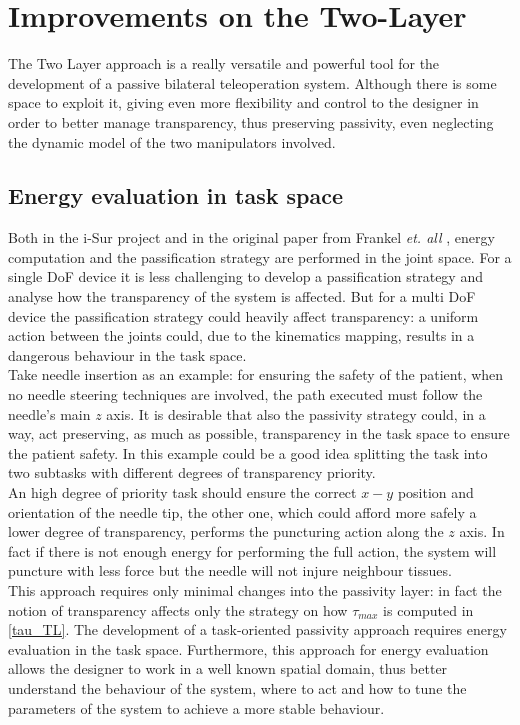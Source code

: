 \section{Improvements  on the Two-Layer  }\label{TwoLayer_improvements}
The Two Layer approach is a really versatile and powerful tool for the development of a passive bilateral teleoperation system. Although there is some space to exploit it, giving even more flexibility and control to the designer in order to better manage transparency, thus preserving passivity, even neglecting the dynamic model of the two manipulators involved.

\subsection{Energy evaluation in task space}
Both in the i-Sur project and in the original paper from Frankel \textit{et. all} \cite{Franken2011}, energy computation and the passification strategy are performed in the joint space.
For a single DoF device it is less challenging to develop a passification strategy and analyse how the transparency of the system is affected. But for a multi DoF device the passification strategy could heavily affect transparency: a uniform action between the joints could, due to the kinematics mapping, results in a dangerous behaviour in the task space.\\
Take needle insertion as an example: for ensuring the safety of the patient, when no needle steering techniques are involved,  the path executed must follow the needle's main $z$ axis.
It is desirable that also the passivity strategy could, in a way, act preserving, as much as possible, transparency in the task space to ensure the patient safety. In this example could be a good idea splitting the task into two subtasks with different degrees of transparency priority.\\
An high degree of priority task should ensure the correct $x-y$ position and orientation of the needle tip, the other one, which could afford more safely a lower degree of transparency, performs the puncturing action along the $z$ axis.
In fact if there is not enough energy for performing the full action, the system will puncture with less force but the needle will not injure neighbour tissues.\\
This approach requires only minimal changes into the passivity layer: in fact the notion of transparency affects only the strategy on how $\tau_{max}$ is computed in \eqref{tau_TL}.
The development of a task-oriented passivity approach requires energy evaluation in the task space.
Furthermore, this approach for energy evaluation allows the designer to work in a well known spatial domain, thus better understand the behaviour of the system, where to act and how to tune the parameters of the system to achieve a more stable behaviour. 

